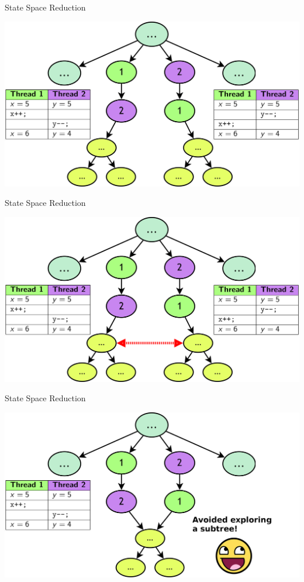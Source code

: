 \documentclass[xcolor=dvipsnames]{beamer}
\begin{document}
\begin{frame}{State Space Reduction}
	\begin{center}
	\includegraphics[width=\textwidth]{undiamond0.png}
	\end{center}
\end{frame}
\begin{frame}{State Space Reduction}
	\begin{center}
	\includegraphics[width=\textwidth]{undiamond1.png}
	\end{center}
\end{frame}
\begin{frame}{State Space Reduction}
	\begin{center}
	\includegraphics[width=\textwidth]{diamond1.png}
	\end{center}
\end{frame}
\end{document}
